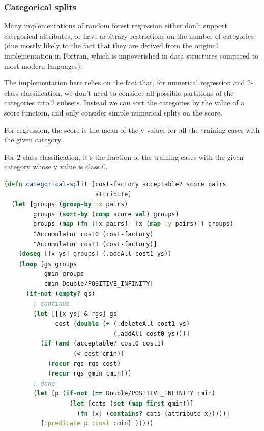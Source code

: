 \documentclass[11pt,openany,american,usenames,dvipsnames,svgnames,x11names,table,isodate]{article}
\numberwithin{equation}{section}
\numberwithin{figure}{section}
\begin{document}
\subsubsection{Categorical splits}

Many implementations of random forest regression either don't support
categorical attributes, or have arbitrary restrictions on the number
of categories (due mostly likely to the fact that they are derived
from the original implementation in Fortran, which is impoverished
in data structures compared to most modern languages).

The implementation here relies on the fact that, for numerical regression
and 2-class classification, we don't need to consider all possible
partitions of the categories into 2 subsets. Instead we can sort the
categories by the value of a score function, and only consider simple
numerical splits on the score. 

For regression, the score is the mean of the y values for all the
training cases with the given category.

For 2-class classification, it's the fraction of the training cases
with the given category whose y value is class 0.

\begin{minipage}[t]{1\columnwidth}%
\begin{lstlisting}[caption={Optimal split on a categorical attribute},label={lis:categorical-split},language=clojure,tabsize=2]
(defn categorical-split [cost-factory acceptable? score pairs 
                         attribute]
  (let [groups (group-by :x pairs)
        groups (sort-by (comp score val) groups)
        groups (map (fn [[x pairs]] [x (map :y pairs)]) groups)
        ^Accumulator cost0 (cost-factory)
        ^Accumulator cost1 (cost-factory)]
    (doseq [[x ys] groups] (.addAll cost1 ys))
    (loop [gs groups
           gmin groups
           cmin Double/POSITIVE_INFINITY]
      (if-not (empty? gs)
        ; continue
        (let [[[x ys] & rgs] gs
              cost (double (+ (.deleteAll cost1 ys) 
                              (.addAll cost0 ys)))]
          (if (and (acceptable? cost0 cost1)
                   (< cost cmin))
            (recur rgs rgs cost)
            (recur rgs gmin cmin)))
        ; done
        (let [p (if-not (== Double/POSITIVE_INFINITY cmin)
                  (let [cats (set (map first gmin))]
                    (fn [x] (contains? cats (attribute x)))))]
          {:predicate p :cost cmin} )))))
\end{lstlisting}
%
\end{minipage}
\end{document}

